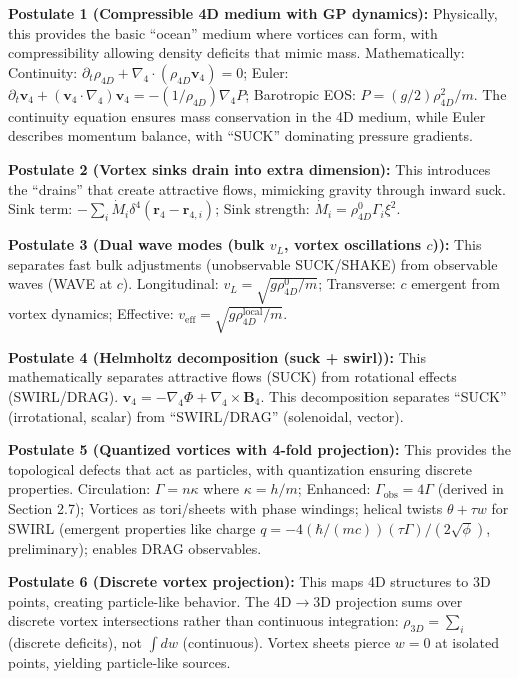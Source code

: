 \begin{tcolorbox}
\textbf{Postulate 1 (Compressible 4D medium with GP dynamics):} Physically, this provides the basic ``ocean'' medium where vortices can form, with compressibility allowing density deficits that mimic mass. Mathematically: Continuity: $\partial_t \rho_{4D} + \nabla_4 \cdot (\rho_{4D} \mathbf{v}_4) = 0$; Euler: $\partial_t \mathbf{v}_4 + (\mathbf{v}_4 \cdot \nabla_4) \mathbf{v}_4 = -(1/\rho_{4D}) \nabla_4 P$; Barotropic EOS: $P = (g/2) \rho_{4D}^2 / m$. The continuity equation ensures mass conservation in the 4D medium, while Euler describes momentum balance, with ``SUCK'' dominating pressure gradients.

\textbf{Postulate 2 (Vortex sinks drain into extra dimension):} This introduces the ``drains'' that create attractive flows, mimicking gravity through inward suck. Sink term: $-\sum_i \dot{M}_i \delta^4(\mathbf{r}_4 - \mathbf{r}_{4,i})$; Sink strength: $\dot{M}_i = \rho_{4D}^0 \Gamma_i \xi^2$.

\textbf{Postulate 3 (Dual wave modes (bulk $v_L$, vortex oscillations $c$)):} This separates fast bulk adjustments (unobservable SUCK/SHAKE) from observable waves (WAVE at $c$). Longitudinal: $v_L = \sqrt{g \rho_{4D}^0 / m}$; Transverse: $c$ emergent from vortex dynamics; Effective: $v_{\text{eff}} = \sqrt{g \rho_{4D}^{\text{local}} / m}$.

\textbf{Postulate 4 (Helmholtz decomposition (suck + swirl)):} This mathematically separates attractive flows (SUCK) from rotational effects (SWIRL/DRAG). $\mathbf{v}_4 = -\nabla_4 \Phi + \nabla_4 \times \mathbf{B}_4$. This decomposition separates ``SUCK'' (irrotational, scalar) from ``SWIRL/DRAG'' (solenoidal, vector).

\textbf{Postulate 5 (Quantized vortices with 4-fold projection):} This provides the topological defects that act as particles, with quantization ensuring discrete properties. Circulation: $\Gamma = n \kappa$ where $\kappa = h / m$; Enhanced: $\Gamma_{\text{obs}} = 4 \Gamma$ (derived in Section 2.7); Vortices as tori/sheets with phase windings; helical twists $\theta + \tau w$ for SWIRL (emergent properties like charge $q = -4 (\hbar / (m c)) (\tau \Gamma) / (2 \sqrt{\phi})$, preliminary); enables DRAG observables.

\textbf{Postulate 6 (Discrete vortex projection):} This maps 4D structures to 3D points, creating particle-like behavior. The 4D$\to$3D projection sums over discrete vortex intersections rather than continuous integration: $\rho_{3D} = \sum_i$ (discrete deficits), not $\int dw$ (continuous). Vortex sheets pierce $w=0$ at isolated points, yielding particle-like sources.
\end{tcolorbox}

